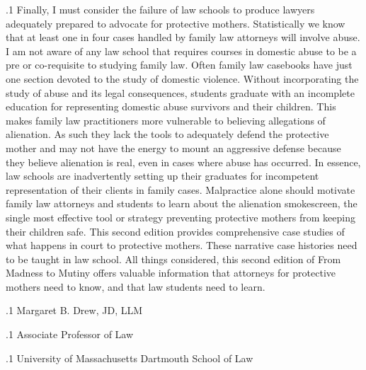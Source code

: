 \documentclass[11pt, twoside]{article}
\begin{document}
{\p.1{%
Finally, I must consider the failure of law schools to produce lawyers
adequately prepared to advocate for protective mothers. Statistically we
know that at least one in four cases handled by family law attorneys will
involve abuse. I am not aware of any law school that requires courses
in domestic abuse to be a pre or co-requisite to studying family law.
Often family law casebooks have just one section devoted to the study
of domestic violence. Without incorporating the study of abuse and
its legal consequences, students graduate with an incomplete education for representing domestic abuse survivors and their children. This
makes family law practitioners more vulnerable to believing allegations
of alienation. As such they lack the tools to adequately defend the protective mother and may not have the energy to mount an aggressive
defense because they believe alienation is real, even in cases where abuse
has occurred. In essence, law schools are inadvertently setting up their
graduates for incompetent representation of their clients in family cases.
Malpractice alone should motivate family law attorneys and students to
learn about the alienation smokescreen, the single most effective tool or
strategy preventing protective mothers from keeping their children safe.
This second edition provides comprehensive case studies of what happens in court to protective mothers. These narrative case histories need
to be taught in law school. All things considered, this second edition of
From Madness to Mutiny offers valuable information that attorneys for
protective mothers need to know, and that law students need to learn.
} %

\p.1{%
\hfill{}Margaret B. Drew, JD, LLM
} %

\p.1{%
\hfill{}Associate Professor of Law
} %

\p.1{%
\hfill{}University of Massachusetts Dartmouth School of Law
} %



}
\end{document}
